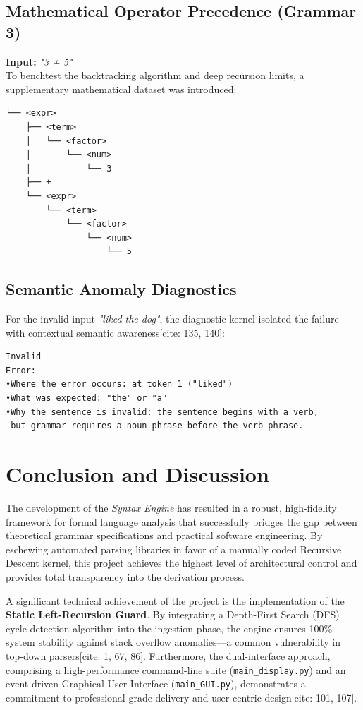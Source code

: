 \documentclass[12pt,a4paper]{article}
\begin{document}
    \subsection{Mathematical Operator Precedence (Grammar 3)}
    \textbf{Input:} \textit{"3 + 5"} \\
    To benchtest the backtracking algorithm and deep recursion limits, a supplementary mathematical dataset was introduced:
\begin{verbatim}
└── <expr>
    ├── <term>
    │   └── <factor>
    │       └── <num>
    │           └── 3
    ├── +
    └── <expr>
        └── <term>
            └── <factor>
                └── <num>
                    └── 5
\end{verbatim}

    \subsection{Semantic Anomaly Diagnostics}
    For the invalid input \textit{"liked the dog"}, the diagnostic kernel isolated the failure with contextual semantic awareness[cite: 135, 140]:
\begin{verbatim}
Invalid
Error:
•Where the error occurs: at token 1 ("liked")
•What was expected: "the" or "a"
•Why the sentence is invalid: the sentence begins with a verb, 
 but grammar requires a noun phrase before the verb phrase.
\end{verbatim}

    \section{Conclusion and Discussion}
    The development of the \textit{Syntax Engine} has resulted in a robust, high-fidelity framework for formal language analysis that successfully bridges the gap between theoretical grammar specifications and practical software engineering. By eschewing automated parsing libraries in favor of a manually coded Recursive Descent kernel, this project achieves the highest level of architectural control and provides total transparency into the derivation process.

    A significant technical achievement of the project is the implementation of the \textbf{Static Left-Recursion Guard}. By integrating a Depth-First Search (DFS) cycle-detection algorithm into the ingestion phase, the engine ensures 100\% system stability against stack overflow anomalies—a common vulnerability in top-down parsers[cite: 1, 67, 86]. Furthermore, the dual-interface approach, comprising a high-performance command-line suite (\texttt{main\_display.py}) and an event-driven Graphical User Interface (\texttt{main\_GUI.py}), demonstrates a commitment to professional-grade delivery and user-centric design[cite: 101, 107].
\end{document}
